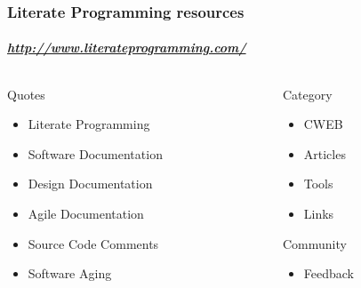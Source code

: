 \documentclass{beamer}
\begin{document}
\frame
{
  \frametitle{Literate Programming resources}
  \framesubtitle{\href{http://www.literateprogramming.com/}{\emph{http://www.literateprogramming.com/}}}

\begin{columns}
	\begin{column}{5cm}
		\alert{Quotes}
		\begin{itemize}
			\item 
			Literate Programming
			\item 
			Software Documentation
			\item 
			Design Documentation
			\item 
			Agile Documentation
			\item 
			Source Code Comments
			\item 
			Software Aging
		\end{itemize}
	\end{column}
\pause
	\begin{column}{5cm}
		\alert{Category}
		\begin{itemize}
			\item 
			CWEB
			\item 
			Articles
			\item 
			Tools
			\item 
			Links
		\end{itemize}
		\alert{Community}
		\begin{itemize}
			\item 
			Feedback
		\end{itemize}
	\end{column}
\end{columns}


}
\end{document}

